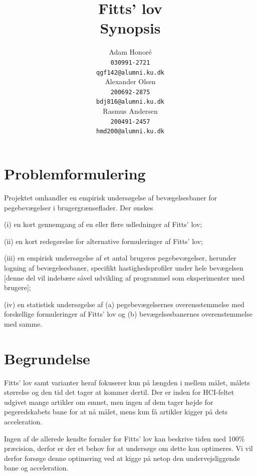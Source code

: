 \documentclass{article}
\author{
  \Large{Adam Honoré}
    \\ \texttt{030991-2721}
    \\ \texttt{qgf142@alumni.ku.dk}
  \\ \Large{Alexander Olsen}
    \\ \texttt{200692-2875}
    \\ \texttt{bdj816@alumni.ku.dk}
  \\ \Large{Rasmus Andersen}
    \\ \texttt{200491-2457}
    \\ \texttt{hmd200@alumni.ku.dk} \\
}
\title{
  \vspace{3cm}
  \Huge{Fitts' lov} \\
  \Large{Synopsis}
}
\begin{document}


\clearpage\maketitle
\thispagestyle{empty}

\newpage

\section{Problemformulering}
Projektet omhandler en empirisk undersøgelse af bevægelsesbaner for pegebevægelser i brugergrænseflader. Der ønskes 

(i) en kort gennemgang af en eller flere udledninger af Fitts' lov; 

(ii) en kort redegørelse for alternative formuleringer af Fitts' lov; 

(iii) en empirisk undersøgelse af et antal brugeres pegebevægelser, herunder logning af bevægelsesbaner, specifikt hastighedsprofiler under hele bevægelsen [denne del vil indebære såvel udvikling af programmel som eksperimenter med brugere]; 

(iv) en statistisk undersøgelse af (a) pegebevægelsernes overensstemmelse med forskellige formuleringer af Fitts' lov og (b) bevægelsesbanernes overenstemmelse med samme.


\section{Begrundelse}
Fitts' lov samt varianter heraf fokuserer kun på længden i mellem målet, målets størrelse og den tid det tager at kommer dertil. Der er inden for HCI-feltet udgivet mange artikler om emnet, men ingen af dem tager højde for pegeredskabets bane for at nå målet, mens kun få artikler kigger på dets acceleration. 

Ingen af de allerede kendte formler for Fitts' lov kan beskrive tiden med 100\% præcision, derfor er der et behov for at undersøge om dette kan optimeres. Vi vil derfor forsøge denne optimering ved at kigge på netop den undervejsliggende bane og acceleration.
\end{document}
